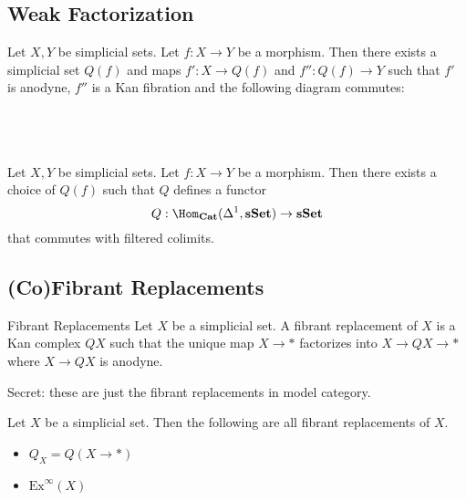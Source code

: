 \documentclass[a4paper]{article}
\begin{document}
\subsection{Weak Factorization}
\begin{prp}{}{} Let $X,Y$ be simplicial sets. Let $f:X\to Y$ be a morphism. Then there exists a simplicial set $Q(f)$ and maps $f':X\to Q(f)$ and $f'':Q(f)\to Y$ such that $f'$ is anodyne, $f''$ is a Kan fibration and the following diagram commutes: \\~\\
\\~\\
\end{prp}

\begin{prp}{}{} Let $X,Y$ be simplicial sets. Let $f:X\to Y$ be a morphism. Then there exists a choice of $Q(f)$ such that $Q$ defines a functor $$Q:\Hom_\bold{Cat}(\Delta^1,\bold{sSet})\to\bold{sSet}$$ that commutes with filtered colimits. 
\end{prp}

\subsection{(Co)Fibrant Replacements}
\begin{defn}{Fibrant Replacements}{} Let $X$ be a simplicial set. A fibrant replacement of $X$ is a Kan complex $QX$ such that the unique map $X\to\ast$ factorizes into $X\to QX\to\ast$ where $X\to QX$ is anodyne. 
\end{defn}

Secret: these are just the fibrant replacements in model category. 

\begin{lmm}{}{} Let $X$ be a simplicial set. Then the following are all fibrant replacements of $X$. 
\begin{itemize}
\item $Q_X=Q(X\to\ast)$
\item $\text{Ex}^\infty(X)$
\end{itemize}
\end{lmm}
\end{document}
